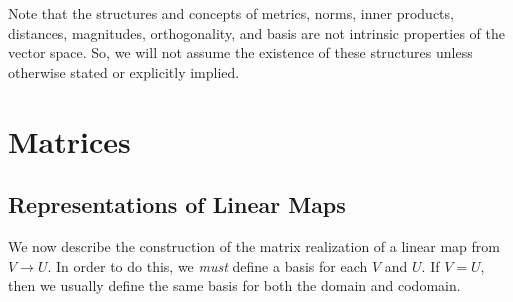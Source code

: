 \documentclass{article}
\theoremstyle{remark}
\theoremstyle{definition}
\begin{document}
  Note that the structures and concepts of metrics, norms, inner products, distances, magnitudes, orthogonality, and basis are not intrinsic properties of the vector space. So, we will not assume the existence of these structures unless otherwise stated or explicitly implied. 

\section{Matrices}

  \subsection{Representations of Linear Maps} 

    We now describe the construction of the matrix realization of a linear map from $V \longrightarrow U$. In order to do this, we \textit{must} define a basis for each $V$ and $U$. If $V = U$, then we usually define the same basis for both the domain and codomain. 
\end{document}
